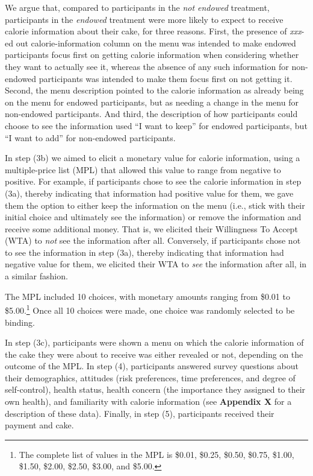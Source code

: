 \documentclass[12pt]{article}
\begin{document}
We argue that, compared to participants in the \emph{not endowed} treatment, participants in the \emph{endowed} treatment were more likely to expect to receive calorie information about their cake, for three reasons. First, the presence of \emph{xxx}-ed out calorie-information column on the menu was intended to make endowed participants focus first on getting calorie information when considering whether they want to actually see it, whereas the absence of any such information for non-endowed participants was intended to make them focus first on not getting it. Second, the menu description pointed to the calorie information as already being on the menu for endowed participants, but as needing a change in the menu for non-endowed participants. And third, the description of how participants could choose to see the information used \enquote{I want to keep} for endowed participants, but \enquote{I want to add} for non-endowed participants.


In step (3b) we aimed to elicit a monetary value for calorie information, using a multiple-price list (MPL) that allowed this value to range from negative to positive. For example, if participants chose to see the calorie information in step (3a), thereby indicating that information had positive value for them, we gave them the option to either keep the information on the menu (i.e., stick with their initial choice and ultimately see the information) or remove the information and receive some additional money. That is, we elicited their Willingness To Accept (WTA) to \emph{not} see the information after all. Conversely, if participants chose not to see the information in step (3a), thereby indicating that information had negative value for them, we elicited their WTA to \emph{see} the information after all, in a similar fashion.

The MPL included 10 choices, with monetary amounts ranging from \$0.01 to \$5.00.\footnote{The complete list of values in the MPL is \$0.01, \$0.25, \$0.50, \$0.75, \$1.00, \$1.50, \$2.00, \$2.50, \$3.00, and \$5.00.}  Once all 10 choices were made, one choice was randomly selected to be binding.

In step (3c), participants were shown a menu on which the calorie information of the cake they were about to receive was either revealed or not, depending on the outcome of the MPL. In step (4), participants answered survey questions about their demographics, attitudes (risk preferences, time preferences, and degree of self-control), health status, health concern (the importance they assigned to their own health), and familiarity with calorie information (see \textbf{Appendix X} for a description of these data). Finally, in step (5), participants received their payment and cake.
\end{document}
